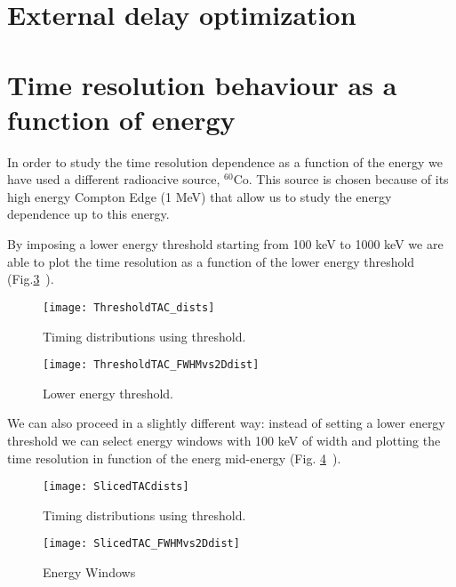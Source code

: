 \section*{External delay optimization}

\section*{Time resolution behaviour as a function of energy}
In order to study the time resolution dependence as a function of the energy we have used a different radioacive source, $^{60}$Co. This source is chosen because of its high energy Compton Edge (1 MeV) that allow us to study the energy dependence up to this energy. 

\smallskip

\noindent By imposing a lower energy threshold starting from 100 keV to 1000 keV we are able to plot the time resolution as a function of the lower energy threshold (Fig.\ref{Fig: lower energy thr}~).

\smallskip

\begin{figure}[h!]
\centering
\texttt{[image: ThresholdTAC\_dists]}
\caption{Timing distributions using threshold.}
\label{Fig: lower energy thr}
\end{figure}

\begin{figure}[h!]
\centering
\texttt{[image: ThresholdTAC\_FWHMvs2Ddist]}
\caption{Lower energy threshold.}
\label{Fig: lower energy thr}
\end{figure}


\smallskip

\noindent We can also proceed in a slightly different way: instead of setting a lower energy threshold we can select energy windows with 100 keV of width and plotting the time resolution in function of the energ mid-energy (Fig. \ref{fig: energy windows analog}~).

\begin{figure}[h!]
\centering
\texttt{[image: SlicedTACdists]}
\caption{Timing distributions using threshold.}
\label{Fig: lower energy thr}
\end{figure}

\begin{figure}[h!]
\centering
\texttt{[image: SlicedTAC\_FWHMvs2Ddist]}
\caption{Energy Windows}
\label{fig: energy windows analog}
\end{figure}

